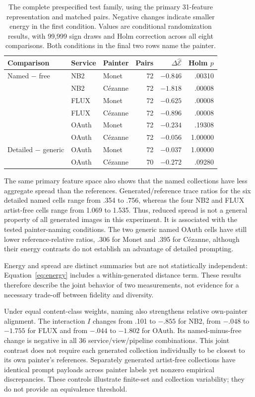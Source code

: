 \documentclass[11pt]{article}
\newcommand{\E}{\widehat{\mathcal E}}
\begin{document}
\begin{table}[tbp]
\centering\small
\begin{tabular}{lllrrr}
\toprule
Comparison & Service & Painter & Pairs & $\Delta\E$ & Holm $p$\\
\midrule
Named $-$ free & NB2 & Monet & 72 & $-0.846$ & .00310\\
 & NB2 & C\'ezanne & 72 & $-1.818$ & .00008\\
 & FLUX & Monet & 72 & $-0.625$ & .00008\\
 & FLUX & C\'ezanne & 72 & $-0.896$ & .00008\\
 & OAuth & Monet & 72 & $-0.234$ & .19308\\
 & OAuth & C\'ezanne & 72 & $-0.056$ & 1.00000\\
\midrule
Detailed $-$ generic & OAuth & Monet & 72 & $-0.037$ & 1.00000\\
 & OAuth & C\'ezanne & 70 & $-0.272$ & .09280\\
\bottomrule
\end{tabular}
\caption{The complete prespecified test family, using the primary 31-feature
representation and matched pairs. Negative changes indicate smaller energy
in the first condition. Values are conditional randomization results, with
99,999 sign draws and Holm correction across all eight comparisons. Both
conditions in the final two rows name the painter.}
\label{tab:contrasts}
\end{table}

The same primary feature space also shows that the named collections have less
aggregate spread than the references. Generated/reference trace ratios for the
six detailed named cells range from .354 to .756, whereas the four NB2 and FLUX
artist-free cells range from 1.069 to 1.535. Thus, reduced spread is not a general
property of all generated images in this experiment. It is associated with the
tested painter-naming conditions. The two generic named OAuth cells have still
lower reference-relative ratios, .306 for Monet and .395 for C\'ezanne, although
their energy contrasts do not establish an advantage of detailed prompting.

Energy and spread are distinct summaries but are not statistically independent:
Equation~\ref{eq:energy} includes a within-generated distance term. These results
therefore describe the joint behavior of two measurements, not evidence for a
necessary trade-off between fidelity and diversity.

Under equal content-class weights, naming also strengthens relative
own-painter alignment. The interaction $I$ changes from .101 to $-.855$ for
NB2, from $-.048$ to $-1.755$ for FLUX and from $-.044$ to $-1.802$ for OAuth.
Its named-minus-free change is negative in all 36 service/view/pipeline
combinations. This joint contrast does not require each generated collection
individually to be closest to its own painter's references. Separately generated
artist-free collections have identical
prompt payloads across painter labels yet nonzero empirical discrepancies.
These controls illustrate finite-set
and collection variability; they do not provide an equivalence threshold.
\end{document}
